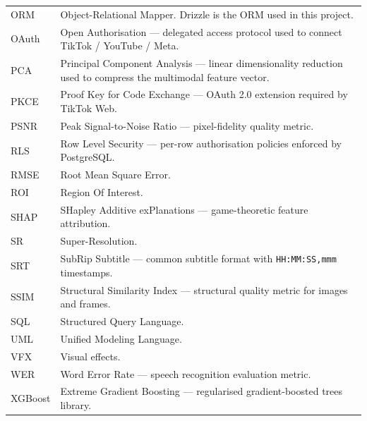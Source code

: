 \begin{tabular}{p{3.0cm} p{12.5cm}}
ORM        & Object-Relational Mapper. Drizzle is the ORM used in this project. \\
OAuth      & Open Authorisation --- delegated access protocol used to connect TikTok / YouTube / Meta. \\
PCA        & Principal Component Analysis --- linear dimensionality reduction used to compress the multimodal feature vector. \\
PKCE       & Proof Key for Code Exchange --- OAuth 2.0 extension required by TikTok Web. \\
PSNR       & Peak Signal-to-Noise Ratio --- pixel-fidelity quality metric. \\
RLS        & Row Level Security --- per-row authorisation policies enforced by PostgreSQL. \\
RMSE       & Root Mean Square Error. \\
ROI        & Region Of Interest. \\
SHAP       & SHapley Additive exPlanations --- game-theoretic feature attribution. \\
SR         & Super-Resolution. \\
SRT        & SubRip Subtitle --- common subtitle format with \texttt{HH:MM:SS,mmm} timestamps. \\
SSIM       & Structural Similarity Index --- structural quality metric for images and frames. \\
SQL        & Structured Query Language. \\
UML        & Unified Modeling Language. \\
VFX        & Visual effects. \\
WER        & Word Error Rate --- speech recognition evaluation metric. \\
XGBoost    & Extreme Gradient Boosting --- regularised gradient-boosted trees library. \\
\bottomrule
\end{tabular}

\cleardoublepage

